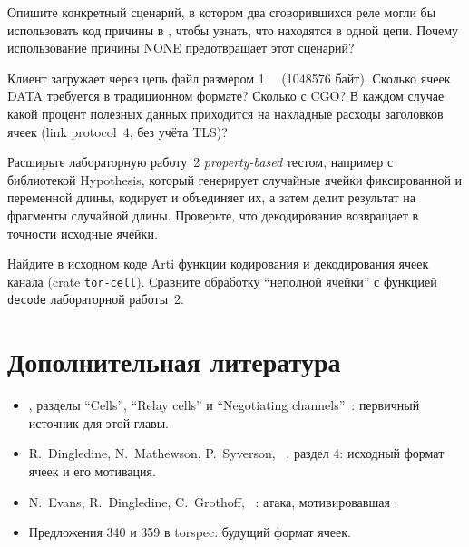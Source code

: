 \begin{esercizio}[2]\label{es:08-destroy}
Опишите конкретный сценарий, в котором два сговорившихся реле могли бы использовать код причины в , чтобы узнать, что находятся в одной цепи. Почему использование причины NONE предотвращает этот сценарий?
\end{esercizio}

\begin{esercizio}[2]\label{es:08-efficienza}
Клиент загружает через цепь файл размером \SI{1}{\mebi\byte} (\num{1048576} байт). Сколько ячеек DATA требуется в традиционном формате? Сколько с CGO? В каждом случае какой процент полезных данных приходится на накладные расходы заголовков ячеек (link protocol~4, без учёта TLS)?
\end{esercizio}

\begin{esercizio}[3]\label{es:08-lab-fuzz}
Расширьте лабораторную работу~2 \emph{property-based} тестом, например с библиотекой Hypothesis, который генерирует случайные ячейки фиксированной и переменной длины, кодирует и объединяет их, а затем делит результат на фрагменты случайной длины. Проверьте, что декодирование возвращает в точности исходные ячейки.
\end{esercizio}

\begin{esercizio}[3]\label{es:08-arti}
Найдите в исходном коде Arti функции кодирования и декодирования ячеек канала (crate \texttt{tor-cell}). Сравните обработку \enquote{неполной ячейки} с функцией \texttt{decode} лабораторной работы~2.
\end{esercizio}

\section*{Дополнительная литература}
\begin{itemize}
  \item {}, разделы \enquote{Cells}, \enquote{Relay cells} и \enquote{Negotiating channels}~\cite{torspec}: первичный источник для этой главы.
  \item R.~Dingledine, N.~Mathewson, P.~Syverson, ~\cite{dingledine2004tor}, раздел 4: исходный формат ячеек и его мотивация.
  \item N.~Evans, R.~Dingledine, C.~Grothoff, ~\cite{evans2009congestion}: атака, мотивировавшая .
  \item Предложения 340 и 359 в torspec: будущий формат ячеек.
\end{itemize}
